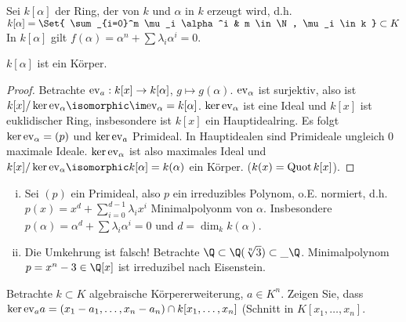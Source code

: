 \begin{df}
    Sei $k[\alpha]$ der Ring, der von $k$ und $\alpha$ in $k$ erzeugt wird, d.h.
    \begin{math}
        k[\alpha] = \Set{ \sum_{i=0}^m \mu_i \alpha^i & m \in \N, \mu_i \in k } \subset K
    \end{math}
    In $k[\alpha]$ gilt $f(\alpha) = \alpha^n + \sum \lambda_i \alpha^i = 0$.
\end{df}

\begin{nt}
    $k[\alpha]$ ist ein Körper.
    \begin{proof}
        Betrachte $\mathrm{ev}_a: k[x] \to k[\alpha]$, $g \mapsto g(\alpha)$.
        $\mathrm{ev}_\alpha$ ist surjektiv, also ist $k[x] / \ker \ev_\alpha \isomorphic \im \ev_\alpha = k[\alpha]$.
        $\ker \mathrm{ev}_\alpha$ ist eine Ideal und $k[x]$ ist euklidischer Ring, insbesondere ist $k[x]$ ein Hauptidealring.
        Es folgt $\ker \mathrm{ev}_\alpha = (p)$ und $\ker \mathrm{ev}_a$ Primideal.
        In Hauptidealen sind Primideale ungleich 0 maximale Ideale.
        $\ker \mathrm{ev}_\alpha$ ist also maximales Ideal  und $k[x] / \ker \ev_\alpha \isomorphic k[\alpha] = k(\alpha)$ ein Körper.
        ($k(x) = \operatorname{Quot} k[x]$).
    \end{proof}
    \begin{note}
        \begin{enumerate}[i)]
            \item
                Sei $(p)$ ein Primideal, also $p$ ein irreduzibles Polynom, o.E. normiert, d.h.
                \begin{math}
                    p(x) = x^d + \sum_{i=0}^{d-1} \lambda_i x^i
                \end{math}
                Minimalpolyonm von $\alpha$.
                Insbesondere $p(\alpha) = \alpha^d + \sum \lambda_i \alpha^i = 0$ und $d = \dim_k k(\alpha)$.
            \item
                Die Umkehrung ist falsch!
                Betrachte $\Q \subset \Q(\sqrt[n]{3}) \subset \_\Q$.
                Minimalpolynom $p = x^n - 3 \in \Q[x]$ ist irreduzibel nach Eisenstein.
        \end{enumerate}
    \end{note}
\end{nt}

\begin{ex}[Übung]
    Betrachte $k \subset K$ algebraische Körpererweiterung, $a \in K^n$.
    Zeigen Sie, dass $\ker \mathrm{ev}_aa = (x_1 - a_1, \dotsc, x_n - a_n) \cap k[x_1, \dotsc, x_n]$ (Schnitt in $K[x_1, \dotsc, x_n]$.
\end{ex}



